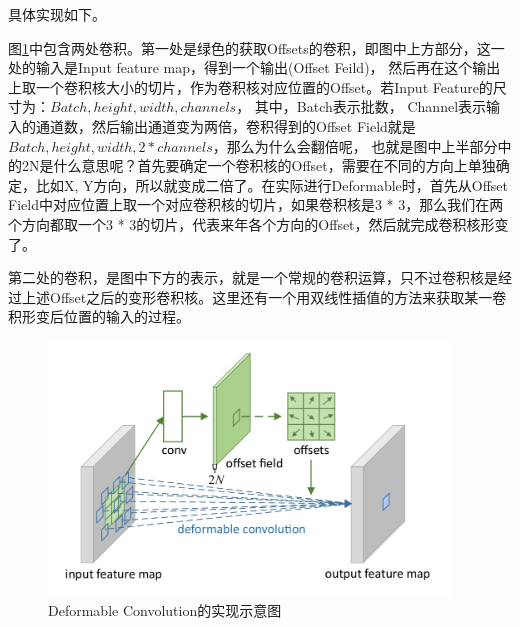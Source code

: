 具体实现如下。


图\ref{DeformableConv1}中包含两处卷积。第一处是绿色的获取Offsets的卷积，即图中上方部分，这一处的输入是Input feature map，得到一个输出(Offset Feild)， 然后再在这个输出上取一个卷积核大小的切片，作为卷积核对应位置的Offset。若Input Feature的尺寸为：$Batch, height, width, channels$， 其中，Batch表示批数， Channel表示输入的通道数，然后输出通道变为两倍，卷积得到的Offset Field就是$Batch, height, width, 2 *  channels$，那么为什么会翻倍呢， 也就是图中上半部分中的2N是什么意思呢？首先要确定一个卷积核的Offset，需要在不同的方向上单独确定，比如X, Y方向，所以就变成二倍了。在实际进行Deformable时，首先从Offset Field中对应位置上取一个对应卷积核的切片，如果卷积核是3 * 3，那么我们在两个方向都取一个3 * 3的切片，代表来年各个方向的Offset，然后就完成卷积核形变了。

第二处的卷积，是图中下方的表示，就是一个常规的卷积运算，只不过卷积核是经过上述Offset之后的变形卷积核。这里还有一个用双线性插值的方法来获取某一卷积形变后位置的输入的过程。

\begin{figure}[!htbp]
\centering
\includegraphics[width=0.95\textwidth]{DLTips/DeformableConv1.jpg}
\caption{Deformable Convolution的实现示意图}
\label{DeformableConv1}
\end{figure}

